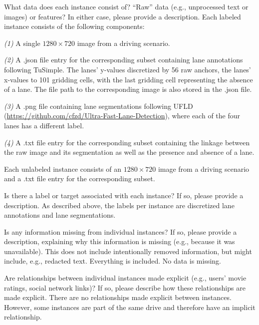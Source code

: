 \documentclass{article}
\begin{document}
	\begin{datasheetitem}{What data does each instance consist of? \normalfont “Raw” data (e.g., unprocessed text or images) or features? In either case, please provide a description.}
		Each labeled instance consists of the following components: \vspace{-2pt}
		
		\textit{(1)} A single $1280\times720$ image from a driving scenario. \vspace{-2pt}
		
		\textit{(2)} A .json file entry for the corresponding subset containing lane annotations following TuSimple. The lanes’ y-values discretized by 56 raw anchors, the lanes’ x-values to 101 gridding cells, with the last gridding cell representing the absence of a lane. The file path to the corresponding image is also stored in the .json file. \vspace{-2pt}
		
		\textit{(3)} A .png file containing lane segmentations following UFLD (\url{https://github.com/cfzd/Ultra-Fast-Lane-Detection}), where each of the four lanes has a different label. \vspace{-2pt}
		
		\textit{(4)} A .txt file entry for the corresponding subset containing the linkage between the raw image and its segmentation as well as the presence and absence of a lane. \vspace{-2pt}
		
		Each unlabeled instance consists of an $1280\times720$ image from a driving scenario and a .txt file entry for the corresponding subset.
	\end{datasheetitem}
	\begin{datasheetitem}{Is there a label or target associated with each instance? \normalfont If so, please provide a description.}
		As described above, the labels per instance are discretized lane annotations and lane segmentations.
	\end{datasheetitem}
	\begin{datasheetitem}{Is any information missing from individual instances? \normalfont If so, please provide a description, explaining why this information is missing (e.g., because it was unavailable). This does not include intentionally removed information, but might include, e.g., redacted text.}
		Everything is included. No data is missing.
	\end{datasheetitem}
	\begin{datasheetitem}{Are relationships between individual instances made explicit (e.g., users’ movie ratings, social network links)? \normalfont If so, please describe how these relationships are made explicit.}
		There are no relationships made explicit between instances. However, some instances are part of the same drive and therefore have an implicit relationship.
	\end{datasheetitem}
\end{document}

